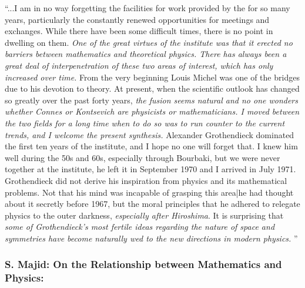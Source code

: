 \documentclass[12pt]{article}
\theoremstyle{plain}
\theoremstyle{definition}
\numberwithin{equation}{section}
\begin{document}
``...I am in no way forgetting the facilities for work provided by the
 for so many years, particularly the constantly renewed opportunities for meetings and exchanges. While there have
been some difficult times, there is no point in dwelling on them.
\emph{One of the great virtues of the institute was that it erected no barriers between
mathematics and theoretical physics. There has always been a great deal of interpenetration
of these two areas of interest, which has only increased over time.}
From the very beginning Louis Michel was one of the bridges due to his devotion to
 theory. At present, when the scientific outlook has changed so greatly over
the past forty years, \emph{the fusion seems natural and no one wonders whether Connes
or Kontsevich are physicists or mathematicians. I moved between the two fields for a long time when to do so was to run counter to the current trends, and I welcome the present synthesis.}
Alexander Grothendieck dominated the first ten years of the institute, and I hope
no one will forget that. I knew him well during the 50s and 60s, especially through
Bourbaki, but we were never together at the institute, he left it in September 1970
and I arrived in July 1971. Grothendieck did not derive his inspiration from physics
and its mathematical problems. Not that his mind was incapable of grasping this
area|he had thought about it secretly before 1967, but the moral principles that
he adhered to relegate physics to the outer darkness, \emph{especially after Hiroshima}. 
It is surprising that \emph{some of Grothendieck's most fertile ideas regarding the nature of
space and symmetries have become naturally wed to the new directions in modern
physics.} ''

\subsubsection{S. Majid: On the Relationship between Mathematics and Physics:}
\end{document}
